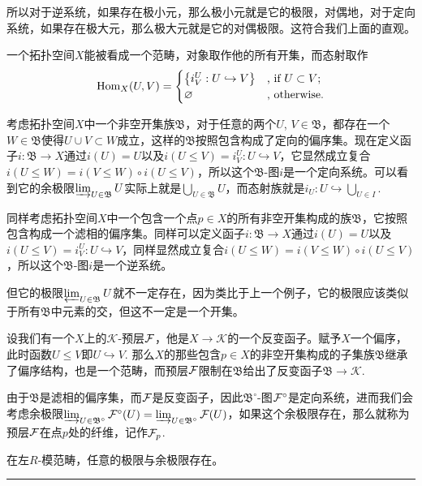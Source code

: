 所以对于逆系统，如果存在极小元，那么极小元就是它的极限，对偶地，对于定向系统，如果存在极大元，那么极大元就是它的对偶极限。这符合我们上面的直观。

\para 一个拓扑空间$X$能被看成一个范畴，对象取作他的所有开集，而态射取作
\[
	\operatorname{Hom}_{X}(U,V)=\begin{cases}
	\bigl\{i^U_V:U\hookrightarrow V\bigr\}&\text{, if }U\subset V\text{;}\\
	\varnothing&\text{, otherwise}.
	\end{cases}
\]

考虑拓扑空间$X$中一个非空开集族$\mathfrak{B}$，对于任意的两个$U$, $V\in \mathfrak{B}$，都存在一个$W\in \mathfrak{B}$使得$U\cup V\subset W$成立，这样的$\mathfrak{B}$按照包含构成了定向的偏序集。现在定义函子$i:\mathfrak{B}\to X$通过$i(U)=U$以及$i(U\leq V)=i^U_V:U\hookrightarrow V$，它显然成立复合$i(U\leq W)=i(V\leq W)\circ i(U\leq V)$，所以这个$\mathfrak{B}$-图$i$是一个定向系统。可以看到它的余极限$\varinjlim_{U\in \mathfrak{B}} U$实际上就是$\bigcup_{U\in \mathfrak{B}} U$，而态射族就是$i_U:U\hookrightarrow \bigcup_{U\in I}$.

同样考虑拓扑空间$X$中一个包含一个点$p\in X$的所有非空开集构成的族$\mathfrak{B}$，它按照包含构成一个滤相的偏序集。同样可以定义函子$i:\mathfrak{B}\to X$通过$i(U)=U$以及$i(U\leq V)=i^U_V:U\hookrightarrow V$，同样显然成立复合$i(U\leq W)=i(V\leq W)\circ i(U\leq V)$，所以这个$\mathfrak{B}$-图$i$是一个逆系统。

但它的极限$\varprojlim_{U\in \mathfrak{B}} U$就不一定存在，因为类比于上一个例子，它的极限应该类似于所有$\mathfrak{B}$中元素的交，但这不一定是一个开集。

\para 设我们有一个$X$上的$\mathcal{K}$-预层$\mathcal{F}$，他是$X\to \mathcal{K}$的一个反变函子。赋予$X$一个偏序，此时函数$U\leq V$即$U\hookrightarrow V$. 那么$X$的那些包含$p\in X$的非空开集构成的子集族$\mathfrak{B}$继承了偏序结构，也是一个范畴，而预层$\mathcal{F}$限制在$\mathfrak{B}$给出了反变函子$\mathfrak{B}\to \mathcal{K}$.

由于$\mathfrak{B}$是滤相的偏序集，而$\mathcal{F}$是反变函子，因此$\mathfrak{B}^\circ$-图$\mathcal{F}^\circ$是定向系统，进而我们会考虑余极限$\varinjlim_{U\in \mathfrak{B}^\circ} \mathcal{F}^\circ(U)=\varinjlim_{U\in \mathfrak{B}^\circ} \mathcal{F}(U)$，如果这个余极限存在，那么就称为预层$\mathcal{F}$在点$p$处的纤维，记作$\mathcal{F}_p$.



\theo 在左$R$-模范畴，任意的极限与余极限存在。 \rule{2mm}{2mm}